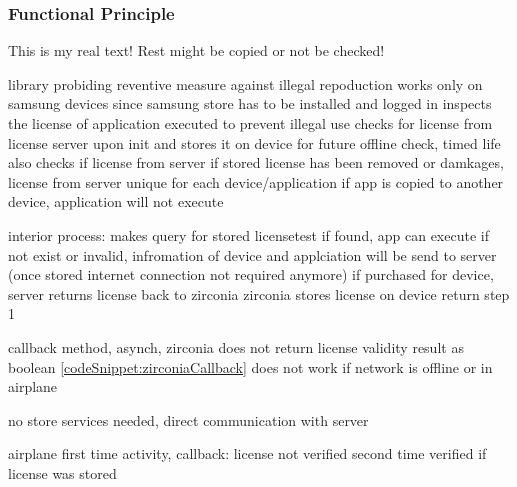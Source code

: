 \subsubsection{Functional Principle} \label{subsection:license-samsung-functional}
This is my real text! Rest might be copied or not be checked!

%
library probiding reventive measure against illegal repoduction
works only on samsung devices since samsung store has to be installed and logged in
inspects the license of application executed to prevent illegal use
checks for license from license server upon init and stores it on device for future offline check, timed life
also checks if license from server if stored license has been removed or damkages, license from server unique for each device/application
if app is copied to another device, application will not execute

interior process:
makes query for stored licensetest
if found, app can execute
if not exist or invalid, infromation of device and applciation will be send to server (once stored internet connection not required anymore)
if purchased for device, server returns license back to zirconia
zirconia stores license on device
return step 1

callback method, asynch, zirconia does not return license validity result as boolean \ref{codeSnippet:zirconiaCallback}
does not work if network is offline or in airplane

\cite{samsungZirconia}
%



no store services needed, direct communication with server

airplane
first time
activity, callback: license not verified
second time
verified if license was stored
